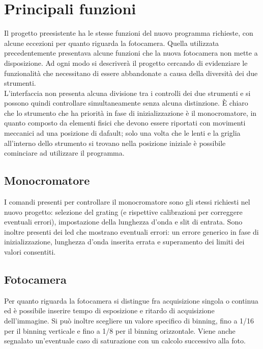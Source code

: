 \section{Principali funzioni}
Il progetto preesistente ha le stesse funzioni del nuovo programma richieste, con alcune eccezioni per quanto riguarda la fotocamera. Quella utilizzata precedentemente presentava alcune funzioni che la nuova fotocamera non mette a disposizione. Ad ogni modo si descriver\`a il progetto cercando di evidenziare le funzionalit\`a che necessitano di essere abbandonate a causa della diversit\`a dei due strumenti.\\
L'interfaccia non presenta alcuna divisione tra i controlli dei due strumenti e si possono quindi controllare simultaneamente senza alcuna distinzione. È chiaro che lo strumento che ha priorità in fase di inizializzazione è il monocromatore, in quanto composto da elementi fisici che devono essere riportati con movimenti meccanici ad una posizione di dafault; solo una volta che le lenti e la griglia all'interno dello strumento si trovano nella posizione iniziale è possibile cominciare ad utilizzare il programma.

\subsection{Monocromatore}
I comandi presenti per controllare il monocromatore sono gli stessi richiesti nel nuovo progetto: selezione del grating (e rispettive calibrazioni per correggere eventuali errori), impostazione della lunghezza d'onda e slit di entrata. Sono inoltre presenti dei led che mostrano eventuali errori: un errore generico in fase di inizializzazione, lunghezza d'onda inserita errata e superamento dei limiti dei valori consentiti.

\subsection{Fotocamera}
Per quanto riguarda la fotocamera si distingue fra acquisizione singola o continua ed è possibile inserire tempo di esposizione e ritardo di acquisizione dell'immagine. Si può inoltre scegliere un valore specifico di binning, fino a 1/16 per il binning verticale e fino a 1/8 per il binning orizzontale. Viene anche segnalato un'eventuale caso di saturazione con un calcolo successivo alla foto.

